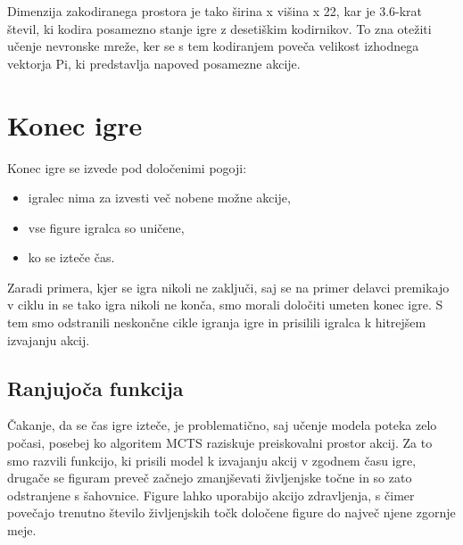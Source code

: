 \documentclass[a4paper, 12pt]{book}
\begin{document}
Dimenzija zakodiranega prostora je tako širina x višina x 22, kar je 3.6-krat števil, ki kodira posamezno stanje igre z desetiškim kodirnikov.
To zna otežiti učenje nevronske mreže, ker se s tem kodiranjem poveča velikost izhodnega vektorja Pi, ki predstavlja napoved posamezne akcije.

\section{Konec igre}
\label{sKonecIgre}
Konec igre se izvede pod določenimi pogoji:
\begin{itemize}
	\item igralec nima za izvesti več nobene možne akcije,
	\item vse figure igralca so uničene,
	\item ko se izteče čas.
\end{itemize}
Zaradi primera, kjer se igra nikoli ne zaključi, saj se na primer delavci premikajo v ciklu in se tako igra nikoli ne konča, smo morali določiti umeten konec igre.
S tem smo odstranili neskončne cikle igranja igre in prisilili igralca k hitrejšem izvajanju akcij.

\subsection{Ranjujoča funkcija}
\label{sKillFunction}
Čakanje, da se čas igre izteče, je problematično, saj učenje modela poteka zelo počasi, posebej ko algoritem MCTS raziskuje preiskovalni prostor akcij.
Za to smo razvili funkcijo, ki prisili model k izvajanju akcij v zgodnem času igre, drugače se figuram preveč začnejo zmanjševati življenjske točne in so zato odstranjene s šahovnice.
Figure lahko uporabijo akcijo zdravljenja, s čimer povečajo trenutno število življenjskih točk določene figure do največ njene zgornje meje.
\end{document}
